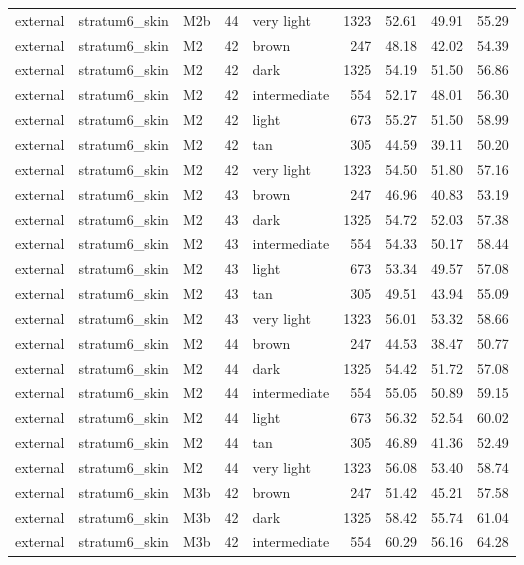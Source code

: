 \begin{tabular}{lllrlrrrr}
external & stratum6\_skin & M2b & 44 & very light & 1323 & 52.61 & 49.91 & 55.29 \\
external & stratum6\_skin & M2 & 42 & brown & 247 & 48.18 & 42.02 & 54.39 \\
external & stratum6\_skin & M2 & 42 & dark & 1325 & 54.19 & 51.50 & 56.86 \\
external & stratum6\_skin & M2 & 42 & intermediate & 554 & 52.17 & 48.01 & 56.30 \\
external & stratum6\_skin & M2 & 42 & light & 673 & 55.27 & 51.50 & 58.99 \\
external & stratum6\_skin & M2 & 42 & tan & 305 & 44.59 & 39.11 & 50.20 \\
external & stratum6\_skin & M2 & 42 & very light & 1323 & 54.50 & 51.80 & 57.16 \\
external & stratum6\_skin & M2 & 43 & brown & 247 & 46.96 & 40.83 & 53.19 \\
external & stratum6\_skin & M2 & 43 & dark & 1325 & 54.72 & 52.03 & 57.38 \\
external & stratum6\_skin & M2 & 43 & intermediate & 554 & 54.33 & 50.17 & 58.44 \\
external & stratum6\_skin & M2 & 43 & light & 673 & 53.34 & 49.57 & 57.08 \\
external & stratum6\_skin & M2 & 43 & tan & 305 & 49.51 & 43.94 & 55.09 \\
external & stratum6\_skin & M2 & 43 & very light & 1323 & 56.01 & 53.32 & 58.66 \\
external & stratum6\_skin & M2 & 44 & brown & 247 & 44.53 & 38.47 & 50.77 \\
external & stratum6\_skin & M2 & 44 & dark & 1325 & 54.42 & 51.72 & 57.08 \\
external & stratum6\_skin & M2 & 44 & intermediate & 554 & 55.05 & 50.89 & 59.15 \\
external & stratum6\_skin & M2 & 44 & light & 673 & 56.32 & 52.54 & 60.02 \\
external & stratum6\_skin & M2 & 44 & tan & 305 & 46.89 & 41.36 & 52.49 \\
external & stratum6\_skin & M2 & 44 & very light & 1323 & 56.08 & 53.40 & 58.74 \\
external & stratum6\_skin & M3b & 42 & brown & 247 & 51.42 & 45.21 & 57.58 \\
external & stratum6\_skin & M3b & 42 & dark & 1325 & 58.42 & 55.74 & 61.04 \\
external & stratum6\_skin & M3b & 42 & intermediate & 554 & 60.29 & 56.16 & 64.28 \\

\end{tabular}
